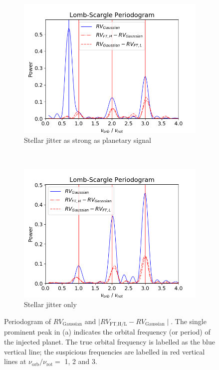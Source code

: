 \begin{figure}[htbp]	
    \begin{subfigure}[b]{0.49\textwidth}
        \includegraphics[width=\textwidth]{./Figures/Methods/0-Periodogram_1.png}
        \caption{Stellar jitter as strong as planetary signal}
        \label{fig:Periodogram1}
    \end{subfigure}
	~
    \begin{subfigure}[b]{0.49\textwidth}
        \includegraphics[width=\textwidth]{./Figures/Methods/0-Periodogram_2.png}
        \caption{Stellar jitter only}
        \label{fig:Periodogram2}
    \end{subfigure}	
    \caption[Periodogram combined with $\mathit{\Phi}$ESTA]
    {Periodogram of $RV_\text{Gaussian}$ and $\mid RV_\text{FT,H/L} - RV_\text{Gaussian} \mid$. The single prominent peak in (a) indicates the orbital frequency (or period) of the injected planet. The true orbital frequency is labelled as the blue vertical line; the suspicious frequencies are labelled in red vertical lines at $\nu_\text{orb}/\nu_\text{rot} =$ 1, 2 and 3.}
\label{fig:Periodogram}
\end{figure}    



